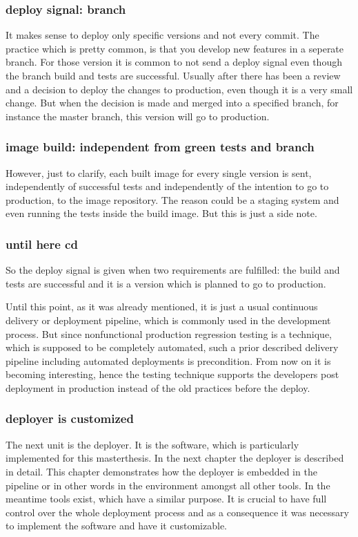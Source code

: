 \subsubsection{deploy signal: branch}
It makes sense to deploy only specific versions and not every commit. The practice which
is pretty common, is that you develop new features in a seperate branch. For those version
it is common to not send a deploy signal even though the branch build and tests are
successful. Usually after there has been a review and a decision to deploy the changes to
production, even though it is a very small change. But when the decision is made and
merged into a specified branch, for instance the master branch, this version will go to
production.

\subsubsection{image build: independent from green tests and branch}
However, just to clarify, each built image for every single version is sent, independently
of successful tests and independently of the intention to go to production, to the image
repository. The reason could be a staging system and even running the tests inside the
build image. But this is just a side note.

\subsubsection{until here cd}
So the deploy signal is given when two requirements are fulfilled: the build and tests are
successful and it is a version which is planned to go to production.

Until this point, as it was already mentioned, it is just a usual continuous delivery or
deployment pipeline, which is commonly used in the development process. But since
nonfunctional production regression testing is a technique, which is supposed to be
completely automated, such a prior described delivery pipeline including automated
deployments is precondition. From now on it is becoming interesting, hence the testing
technique supports the developers post deployment in production instead of the old
practices before the deploy.

\subsubsection{deployer is customized}
The next unit is the deployer. It is the software, which is particularly implemented for
this masterthesis. In the next chapter the deployer is described in detail. This chapter
demonstrates how the deployer is embedded in the pipeline or in other words in the
environment amongst all other tools. In the meantime tools exist, which have a similar
purpose. It is crucial to have full control over the whole deployment process and as a
consequence it was necessary to implement the software and have it customizable.

